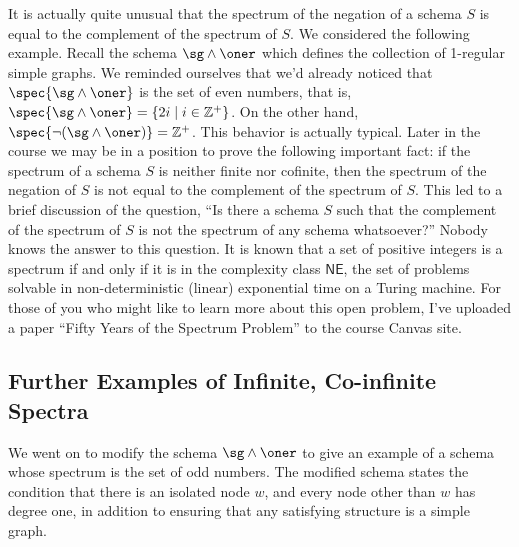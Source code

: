 It is actually quite unusual that the spectrum of the negation of a schema $S$ is equal to the complement of the spectrum of $S$. We considered the following example.
Recall the schema $\sg\wedge\oner$ which defines the collection of 1-regular simple graphs. We reminded ourselves that we'd already noticed that $\spec{\sg\wedge\oner}$ is the set of even numbers, that is, $\spec{\sg\wedge\oner}=\{2i\mid i\in\mathbb{Z}^+\}$. On the other hand, $\spec{\neg(\sg\wedge\oner)}=\mathbb{Z}^+$. This behavior is actually typical. Later in the course we may be in a position to prove the following important fact: if the spectrum of a schema $S$ is neither finite nor cofinite, then the spectrum of the negation of $S$ is not equal to the complement of the spectrum of $S$. This led to a brief discussion of the question, ``Is there a schema $S$ such that the complement of the spectrum of $S$ is not the spectrum of any schema whatsoever?'' Nobody knows the answer to this question. It is known that a set of positive integers is a spectrum if and only if it is in the complexity class $\mathsf{NE}$, the set of problems solvable in non-deterministic (linear) exponential time on a Turing machine. For those of you who might like to learn more about this open problem, I've uploaded a paper ``Fifty Years of the Spectrum Problem'' to the course Canvas site.
\subsection{Further Examples of Infinite, Co-infinite Spectra}

We went on to modify the schema $\sg\wedge\oner$ to give an example of a schema whose spectrum is the set of odd numbers. The modified schema states the condition that there is an isolated node $w$, and every node other than $w$ has degree one, in addition to ensuring that any satisfying structure is a simple graph. 

